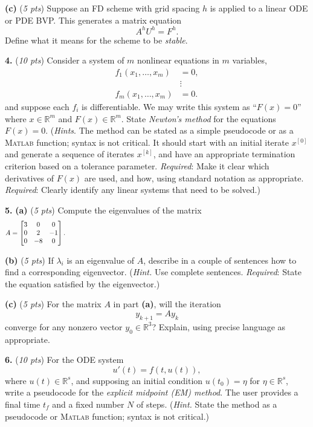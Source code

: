\documentclass[11pt]{amsart}
\newcommand{\RR}{{\mathbb{R}}}
\newcommand{\Matlab}{\textsc{Matlab}\xspace}
\newcommand{\prob}[1]{\bigskip\noindent\textbf{#1.} }
\newcommand{\pts}[1]{(\emph{#1 pts})}
\newcommand{\probpts}[2]{\prob{#1} \pts{#2}}
\newcommand{\ppartpts}[2]{\textbf{(#1)} \pts{#2}}
\newcommand{\epartpts}[2]{\medskip\noindent \textbf{(#1)} \pts{#2}}
\begin{document}
\epartpts{c}{5}   Suppose an FD scheme with grid spacing $h$ is applied to a linear ODE or PDE BVP.  This generates a matrix equation
    $$A^h U^h = F^h.$$
Define what it means for the scheme to be \emph{stable}.
\vspace{2.0in}


\newpage
\probpts{4}{10}  Consider a system of $m$ nonlinear equations in $m$ variables,
\begin{align*}
f_1(x_1,\dots,x_m) &= 0, \\
                   &\vdots \\
f_m(x_1,\dots,x_m) &= 0.
\end{align*}
and suppose each $f_i$ is differentiable.  We may write this system as ``$F(x) = 0$'' where $x\in \RR^m$ and $F(x)\in \RR^m$.  State \emph{Newton's method} for the equations $F(x) = 0$.  (\emph{Hints}.  The method can be stated as a simple pseudocode or as a \Matlab function; syntax is not critical.  It should start with an initial iterate $x^{[0]}$ and generate a sequence of iterates $x^{[k]}$, and have an appropriate termination criterion based on a tolerance parameter.  \emph{Required}:  Make it clear which derivatives of $F(x)$ are used, and how, using standard notation as appropriate.  \emph{Required}:  Clearly identify any linear systems that need to be solved.)
\vfill


\newpage
\prob{5}  \ppartpts{a}{5}  Compute the eigenvalues of the matrix
    $$A = \begin{bmatrix}
    3 & 0 & 0 \\
    0 & 2 & -1 \\
    0 & -8 & 0 
    \end{bmatrix}. \hspace{5.0in}$$
\vfill

\epartpts{b}{5}   If $\lambda_i$ is an eigenvalue of $A$, describe in a couple of sentences how to find a corresponding eigenvector.  (\emph{Hint.}  Use complete sentences.  \emph{Required}:  State the equation satisfied by the eigenvector.)
\vspace{2.5in}

\epartpts{c}{5}   For the matrix $A$ in part \textbf{(a)}, will the iteration
    $$y_{k+1} = A y_k$$
converge for any nonzero vector $y_0\in \RR^3$?  Explain, using precise language as appropriate.
\vspace{2.0in}


\newpage
\probpts{6}{10}  For the ODE system
    $$u'(t) = f(t,u(t)),$$
where $u(t) \in \RR^s$, and supposing an initial condition $u(t_0)=\eta$ for $\eta \in \RR^s$, write a pseudocode for the \emph{explicit midpoint (EM) method}.  The user provides a final time $t_f$ and a fixed number $N$ of steps.  (\emph{Hint.}  State the method as a pseudocode or \Matlab function; syntax is not critical.)
\vfill
\end{document}
